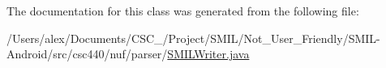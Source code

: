 The documentation for this class was generated from the following file\-:\begin{DoxyCompactItemize}
\item 
/\-Users/alex/\-Documents/\-C\-S\-C\-\_/\-Project/\-S\-M\-I\-L/\-Not\-\_\-\-User\-\_\-\-Friendly/\-S\-M\-I\-L-\/\-Android/src/csc440/nuf/parser/\hyperlink{_s_m_i_l_writer_8java}{S\-M\-I\-L\-Writer.\-java}\end{DoxyCompactItemize}
